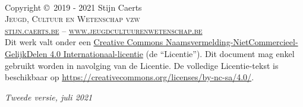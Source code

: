 \documentclass[11pt,fleqn]{book} %
\begin{document}

\begingroup
\thispagestyle{empty} %
\vfill
\endgroup


\newpage
~\vfill
\thispagestyle{empty}
{
\selectfont

\noindent Copyright \copyright\ 2019 - 2021 Stijn Caerts\\ %

\noindent \textsc{Jeugd, Cultuur en Wetenschap vzw}\\ %

\noindent \textsc{\href{https://stijn.caerts.be/}{stijn.caerts.be}} -- \textsc{\href{https://www.jeugdcultuurenwetenschap.be/}{www.jeugdcultuurenwetenschap.be}}\\ %

\noindent Dit werk valt onder een \href{https://creativecommons.org/licenses/by-nc-sa/4.0/deed.nl}{Creative Commons Naamsvermelding-NietCommercieel-GelijkDelen 4.0 Internationaal-licentie} (de ``Licentie''). Dit document mag enkel gebruikt worden in navolging van de Licentie. De volledige Licentie-tekst is beschikbaar op \url{https://creativecommons.org/licenses/by-nc-sa/4.0/}.\\

\noindent \href{https://creativecommons.org/licenses/by-nc-sa/4.0/}{\ccbyncsaeu}

\vspace{1cm}

\noindent \textit{Tweede versie, juli 2021} %
}
\end{document}
